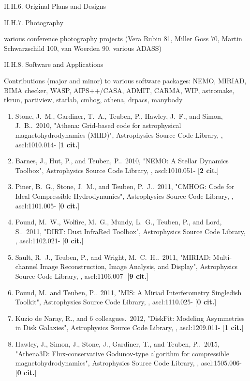 \documentclass[11pt,letterpaper]{article}
\begin{document}
II.H.6. Original Plans and Designs

II.H.7. Photography

various conference photography projects (Vera Rubin 81, Miller Goss 70, Martin Schwarzschild 100, van Woerden 90, various ADASS)

II.H.8. Software and Applications

Contributions (major and minor) to various software packages: NEMO,
MIRIAD, BIMA checker, WASP, AIPS++/CASA, ADMIT, CARMA, WIP, astromake,
tkrun, partiview, starlab, cmhog, athena, drpacs, manybody

\begin{enumerate}[resume,label=\textbf{\arabic*}.]


\item  
Stone, J.~M., Gardiner, T.~A., Teuben, P., Hawley, J.~F., and Simon, 
J.~B..\  2010,  "Athena: Grid-based code for astrophysical 
magnetohydrodynamics (MHD)", Astrophysics Source Code Library,  , 
ascl:1010.014- [{\bf 1 cit.}]

\item  
Barnes, J., Hut, P., and Teuben, P..\  2010,  "NEMO: A Stellar Dynamics 
Toolbox", Astrophysics Source Code Library,  , ascl:1010.051- [{\bf 2 
cit.}] 

\item  
Piner, B.~G., Stone, J.~M., and Teuben, P.~J..\  2011,  "CMHOG: Code for 
Ideal Compressible Hydrodynamics", Astrophysics Source Code Library,  , 
ascl:1101.005- [{\bf 0 cit.}]

\item  
Pound, M.~W., Wolfire, M.~G., Mundy, L.~G., Teuben, P., and Lord, S..\  
2011,  "DIRT: Dust InfraRed Toolbox", Astrophysics Source Code Library,  , 
ascl:1102.021- [{\bf 0 cit.}] 
\item  
Sault, R.~J., Teuben, P., and Wright, M.~C.~H..\  2011,  "MIRIAD: 
Multi-channel Image Reconstruction, Image Analysis, and Display", 
Astrophysics Source Code Library,  , ascl:1106.007- [{\bf 9 cit.}] 
\item  
Pound, M.~and Teuben, P..\  2011,  "MIS: A Miriad Interferometry Singledish 
Toolkit", Astrophysics Source Code Library,  , ascl:1110.025- [{\bf 0 
cit.}] 
\item  
Kuzio de Naray, R., and 6 colleagues.\  2012,  "DiskFit: Modeling 
Asymmetries in Disk Galaxies", Astrophysics Source Code Library,  , 
ascl:1209.011- [{\bf 1 cit.}] 
\item  
Hawley, J., Simon, J., Stone, J., Gardiner, T., and Teuben, P..\  2015,  
"Athena3D: Flux-conservative Godunov-type algorithm for compressible 
magnetohydrodynamics", Astrophysics Source Code Library,  , ascl:1505.006- 
[{\bf 0 cit.}] 


  
\end{enumerate}
\end{document}
